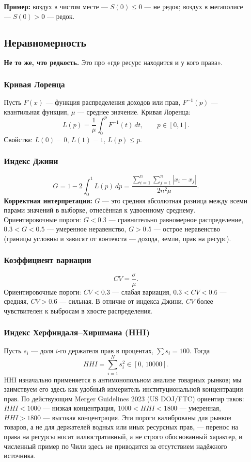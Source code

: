 \documentclass[11pt]{article}
\begin{document}
\textbf{Пример:} воздух в чистом месте — $S(0) \le 0$ — не редок; воздух в мегаполисе — $S(0) > 0$ — редок.

\subsection{Неравномерность}
\textbf{Не то же, что редкость.} Это про «где ресурс находится и у кого права».

\subsubsection{Кривая Лоренца}
Пусть $F(x)$ — функция распределения доходов или прав, $F^{-1}(p)$ — квантильная функция, $\mu$ — среднее значение. Кривая Лоренца:
\[
L(p) = \frac{1}{\mu}\int_0^p F^{-1}(t)\,dt,\qquad p\in[0,1].
\]
Свойства: $L(0)=0$, $L(1)=1$, $L(p)\le p$.

\subsubsection{Индекс Джини}
\[
G = 1 - 2\int_0^1 L(p)\,dp = \frac{\sum_{i=1}^n\sum_{j=1}^n |x_i-x_j|}{2n^2\mu}.
\]
\textbf{Корректная интерпретация:} $G$ — это средняя абсолютная разница между всеми парами значений в выборке, отнесённая к удвоенному среднему. Ориентировочные пороги: $G<0.3$ — сравнительно равномерное распределение, $0.3<G<0.5$ — умеренное неравенство, $G>0.5$ — острое неравенство (границы условны и зависят от контекста — дохода, земли, прав на ресурс).

\subsubsection{Коэффициент вариации}
\[
CV = \frac{\sigma}{\mu}.
\]
Ориентировочные пороги: $CV<0.3$ — слабая вариация, $0.3<CV<0.6$ — средняя, $CV>0.6$ — сильная. В отличие от индекса Джини, $CV$ более чувствителен к выбросам в хвосте распределения.

\subsubsection{Индекс Херфиндаля--Хиршмана (HHI)}
Пусть $s_i$ — доля $i$-го держателя прав в процентах, $\sum s_i = 100$. Тогда
\[
HHI = \sum_{i=1}^N s_i^2 \in [0,\,10000].
\]
HHI изначально применяется в антимонопольном анализе товарных рынков; мы заимствуем его здесь как удобный измеритель институциональной концентрации прав. По действующим Merger Guidelines 2023 (US DOJ/FTC) \cite{ftc_doj_2023merger} ориентир таков: $HHI<1000$ — низкая концентрация, $1000<HHI<1800$ — умеренная, $HHI>1800$ — высокая концентрация. Эти пороги калиброваны для рынков товаров, а не для держателей водных или иных ресурсных прав, — перенос на права на ресурсы носит иллюстративный, а не строго обоснованный характер, и численный пример по Чили здесь не приводится за отсутствием надёжного источника.
\end{document}
